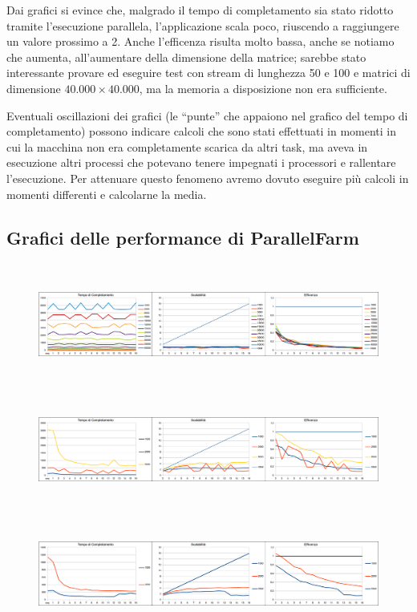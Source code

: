 \documentclass[a4paper,10pt]{article}
\begin{document}
\begin{landscape}
Dai grafici si evince che, malgrado il tempo di completamento sia stato ridotto tramite l'esecuzione parallela, l'applicazione scala poco, riuscendo a raggiungere un valore prossimo a 2. Anche l'efficenza risulta molto bassa, anche se notiamo che aumenta, all'aumentare della dimensione della matrice; sarebbe stato interessante provare ed eseguire test con stream di lunghezza 50 e 100 e matrici di dimensione $40.000 \times 40.000$, ma la memoria a disposizione non era sufficiente.

Eventuali oscillazioni dei grafici (le ``punte'' che appaiono nel grafico del tempo di completamento) possono indicare calcoli che sono stati effettuati in momenti in cui la macchina non era completamente scarica da altri task, ma aveva in esecuzione altri processi che potevano tenere impegnati i processori e rallentare l'esecuzione. Per attenuare questo fenomeno avremo dovuto eseguire pi\`u calcoli in momenti differenti e calcolarne la media.


\subsection{Grafici delle performance di \textsf{ParallelFarm}}

\begin{figure}[ht]
\centering
\includegraphics[height=4cm]{plot1farm.png}
\centering
\includegraphics[height=4cm]{plot50farm.png}
\centering
\includegraphics[height=4cm]{plot100farm.png}



\end{figure}
\end{landscape}
\end{document}
